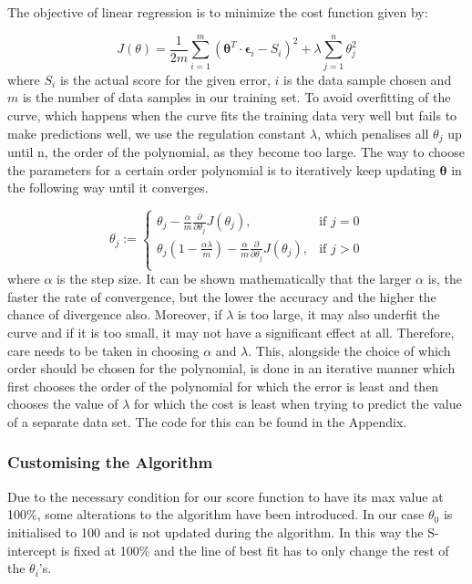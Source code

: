 \documentclass[11pt,a4paper]{article}
\begin{document}
\noindent
The objective of linear regression is to minimize the cost function given by:

\begin{equation}
J(\theta) = \frac{1}{2m} \sum_{i=1}^m \left( \boldsymbol \theta^T \cdot \boldsymbol \epsilon_i - S_i\right)^2  + \lambda \sum_{j=1}^n \theta_j^2
\end{equation} 
where $S_i$ is the actual score for the given error, $i$ is the data sample chosen and $m$ is the number of data samples in our training set. To avoid overfitting of the curve, which happens when the curve fits the training data very well but fails to make predictions well, we use the regulation constant $\lambda$, which penalises all $\theta_j$ up until n, the order of the polynomial, as they become too large. The way to choose the parameters for a certain order polynomial is to iteratively keep updating $\boldsymbol \theta$ in the following way until it converges.

\begin{equation}
  \theta_j :=
\begin{cases}
\theta_j  - \frac{\alpha}{m} \frac{\partial}{\partial \theta_j } J( \theta_j), & \text{if }j = 0 \\
\theta_j \left(1- \frac{\alpha\lambda}{m} \right) - \frac{\alpha}{m} \frac{\partial}{\partial \theta_j } J( \theta_j), & \text{if }j > 0 \\
\end{cases}
\end{equation} 
where $\alpha$ is the step size. It can be shown mathematically that the larger $\alpha$ is, the faster the rate of convergence, but the lower the accuracy and the higher the chance of divergence also. Moreover, if $\lambda$ is too large, it may also underfit the curve and if it is too small, it may not have a significant effect at all. Therefore, care needs to be taken in choosing $\alpha$ and $\lambda$. This, alongside the choice of which order should be chosen for the polynomial, is done in an iterative manner which first chooses the order of the polynomial for which the error is least and then chooses the value of $\lambda$ for which the cost is least when trying to predict the value of a separate data set. The code for this can be found in the Appendix.

\subsubsection{Customising the Algorithm}
\noindent
Due to the necessary condition for our score function to have its max value at 100\%, some alterations to the algorithm have been introduced. In our case $\theta_0$ is initialised to 100 and is not updated during the algorithm. In this way the S-intercept is fixed at 100\% and the line of best fit has to only change the rest of the $\theta_i$'s. 
\end{document}
